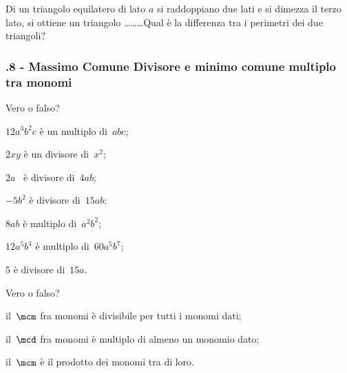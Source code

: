 \begin{esercizio}[\Ast]
 \label{ese:10.43} %
Di un triangolo equilatero di lato $ a $ si raddoppiano due lati e si dimezza il terzo lato, si ottiene un triangolo \ldots\ldots\ldots Qual è la differenza tra i perimetri dei due triangoli?
\end{esercizio}

\subsubsection*{\thechapter.8 - Massimo Comune Divisore e minimo comune multiplo tra monomi}

\begin{esercizio}
 \label{ese:10.44} %
Vero o falso?

\begin{multicols}{2}
\begin{enumeratea}
\item $12a^{3}b^{2}c$ è un multiplo di~$abc$; %
\item $2xy$ è un divisore di~$x^{2}$; %
\item $2a$ \ è divisore di~$4ab$; %
\item $-5b^{2}$ è divisore di~$15ab$; %
\item $8ab$ è multiplo di~$a^{2}b^{2}$; %
\item $12a^{5}b^{4}$ è multiplo di~$60a^{5}b^{7}$; %
\item $5$ è divisore di~$15a$. %
\end{enumeratea}
\end{multicols}
\end{esercizio}
\begin{esercizio}
 \label{ese:10.45} %
Vero o falso?

\begin{enumeratea}
\item il~$\mcm$ fra monomi è divisibile per tutti i monomi dati; %
\item il~$\mcd$ fra monomi è multiplo di almeno un monomio dato; %
\item il~$\mcm$ è il prodotto dei monomi tra di loro. %
\end{enumeratea}
\end{esercizio}

